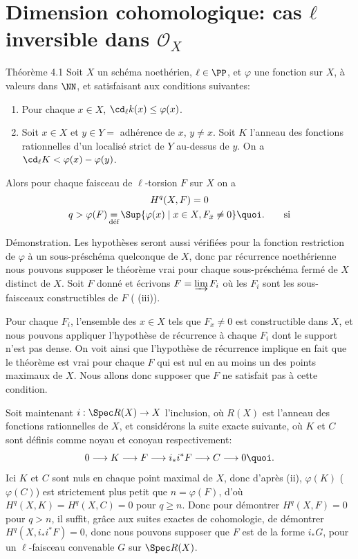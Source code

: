 \documentclass[10pt]{../fichiers-configuration-latex/smfart}
\begin{document}
\section{Dimension cohomologique: cas $ℓ$ inversible dans $𝒪_X$}

\begin{enonce*}{Théorème 4.1}
Soit $X$ un schéma noethérien, $\ell\in \PP$, et
$\varphi$ une fonction sur $X$, à valeurs dans
$\NN$, et satisfaisant aux conditions suivantes:
\begin{enumerate}
\renewcommand{\theenumi}{\roman{enumi}}
\renewcommand{\labelenumi}{(\theenumi)}
\item Pour chaque $x\in X$, $\cd_{\ell}k(x)\leq \varphi (x)$.

\item Soit $x\in X$ et $y\in Y=$ adhérence de $x$, $y\neq x$. Soit $K$
  l'anneau des fonctions rationnelles d'un localisé strict de $Y$
  au-dessus de $y$. On a $\cd_{\ell}K<\varphi(x)-\varphi(y)$.
\end{enumerate}
Alors pour chaque faisceau de $\ell$-torsion $F$ sur $X$ on a
\begin{gather*}
H^q(X,F)=0\\
q>\varphi(F)\mathop{=}_{\text{\rm déf}}\Sup\{\varphi(x)\mid x\in X,
F_{\bar{x}}\neq 0\}{\quoi}.\tag*{si}
\end{gather*}
\end{enonce*}

Démonstration.\pageoriginale 
Les hypothèses seront aussi vérifiées pour la fonction
restriction de $\varphi$\sisi{,}{} à un sous-préschéma quelconque de $X$, donc
par récurrence noethérienne nous pouvons supposer le théorème vrai
pour chaque sous-préschéma fermé de $X$ distinct de $X$. Soit $F$
donné et écrivons $F=\varinjlim F_i$ où les $F_i$ sont les
sous-faisceaux constructibles de $F$ ( (iii)).

Pour chaque $F_i$, l'ensemble des $x\in X$ tels que $F_x\neq 0$ est
constructible dans $X$, et nous pouvons appliquer l'hypothèse de
récurrence à chaque $F_i$ dont le support n'est pas dense. On voit
ainsi que l'hypothèse de récurrence implique en fait que le théorème
est vrai pour chaque $F$ qui est nul en au moins un des points
maximaux de $X$. Nous allons donc supposer que $F$ ne satisfait pas à
cette condition.

Soit maintenant $i:\Spec R(X)\rightarrow X$ l'inclusion, où $R(X)$ est
l'anneau des fonctions rationnelles de $X$, et considérons la suite
exacte suivante, où $K$ et $C$ sont définis comme noyau et conoyau
respectivement:
$$
0\longrightarrow K\longrightarrow F\longrightarrow i_{\ast}
i^{\ast}F\longrightarrow C\longrightarrow 0{\quoi}.
$$
Ici $K$ et $C$ sont nuls en chaque point maximal de $X$, donc d'après
(ii), $\varphi(K)$ (\resp $\varphi(C)$) est strictement plus petit que
$n=\varphi(F)$, d'où $H^q(X,K)=H^q(X,C)=0$ pour $q\geq n$. Donc\sisi{}{,} pour
démontrer $H^q(X,F)=0$ pour $q>n$, il suffit, grâce aux suites exactes
de cohomologie, de démontrer $H^q(X,i_{\ast}i^{\ast}F)=0$, donc nous
pouvons supposer que $F$ est de la forme $i_{\ast}G$, pour un
$\ell$-faisceau convenable $G$ sur $\Spec R(X)$.
\end{document}
